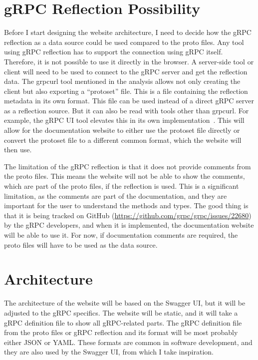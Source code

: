 \section{gRPC Reflection Possibility}
Before I start designing the website architecture, I need to decide how the gRPC reflection as a data source could be used compared to the proto files.
Any tool using gRPC reflection has to support the connection using gRPC itself.
Therefore, it is not possible to use it directly in the browser.
A server-side tool or client will need to be used to connect to the gRPC server and get the reflection data.
The grpcurl tool mentioned in the analysis allows not only creating the client but also exporting a \enquote{protoset} file.
This is a file containing the reflection metadata in its own format.
This file can be used instead of a direct gRPC server as a reflection source.
But it can also be read with tools other than grpcurl.
For example, the gRPC UI tool elevates this in its own implementation~\cite{grpc-grpcui}.
This will allow for the documentation website to either use the protoset file directly or convert the protoset file to a different common format, which the website will then use.

The limitation of the gRPC reflection is that it does not provide comments from the proto files.
This means the website will not be able to show the comments, which are part of the proto files, if the reflection is used.
This is a significant limitation, as the comments are part of the documentation, and they are important for the user to understand the methods and types.
The good thing is that it is being tracked on GitHub (\url{https://github.com/grpc/grpc/issues/22680}) by the gRPC developers, and when it is implemented, the documentation website will be able to use it.
For now, if documentation comments are required, the proto files will have to be used as the data source.


\section{Architecture}
The architecture of the website will be based on the Swagger UI, but it will be adjusted to the gRPC specifics.
The website will be static, and it will take a gRPC definition file to show all gRPC-related parts.
The gRPC definition file from the proto files or gRPC reflection and its format will be most probably either JSON or YAML\@.
These formats are common in software development, and they are also used by the Swagger UI, from which I take inspiration.

